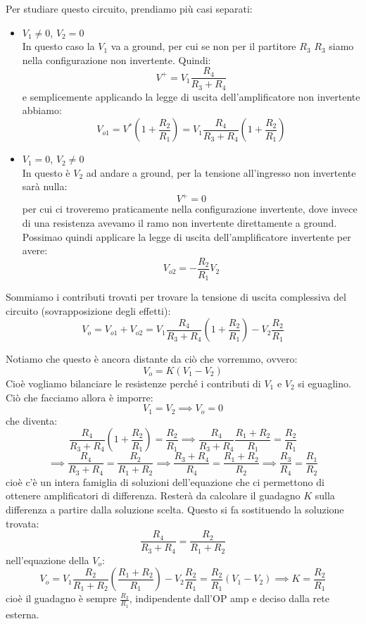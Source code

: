 \documentclass[a4paper,11pt]{article}
\begin{document}
Per studiare questo circuito, prendiamo più casi separati:
\begin{itemize}
\item $V_1 \neq 0$, $V_2 = 0$ \\
In questo caso la $V_1$ va a ground, per cui se non per il partitore $R_3$ $R_3$ siamo nella configurazione non invertente. Quindi:
$$
V^+ = V_1 \frac{R_4}{R_3 + R_4}
$$
e semplicemente applicando la legge di uscita dell'amplificatore non invertente abbiamo:
$$
V_{o1} = V^* \left(1 + \frac{R_2}{R_1}\right) = V_1 \frac{R_4}{R_3 + R_4} \left(1 + \frac{R_2}{R_1}\right)
$$

\item $V_1 = 0$, $V_2 \neq 0$ \\

In questo è $V_2$ ad andare a ground, per la tensione all'ingresso non invertente sarà nulla:
$$
V^+ = 0
$$
per cui ci troveremo praticamente nella configurazione invertente, dove invece di una resistenza avevamo il ramo non invertente direttamente a ground. Possimao quindi applicare la legge di uscita dell'amplificatore invertente per avere:
$$
V_{o2} = -\frac{R_2}{R_1} V_2
$$

\end{itemize}

Sommiamo i contributi trovati per trovare la tensione di uscita complessiva del circuito (sovrapposizione degli effetti):
$$
V_o = V_{o1} + V_{o2} = V_1 \frac{R_4}{R_3 + R_4} (1 + \frac{R_2}{R_1}) - V_2 \frac{R_2}{R_1}
$$

Notiamo che questo è ancora distante da ciò che vorremmo, ovvero:
$$
V_o = K (V_1 - V_2)
$$
Cioè vogliamo bilanciare le resistenze perché i contributi di $V_1$ e $V_2$ si eguaglino. Ciò che facciamo allora è imporre:
$$
V_1 = V_2 \implies V_o = 0
$$
che diventa:
$$
\frac{R_4}{R_3 + R_4} \left( 1 + \frac{R_2}{R_1} \right) = \frac{R_2}{R_1} \implies \frac{R_4}{R_3 + R_4} \frac{R_1 + R_2}{R_1} = \frac{R_2}{R_1} 
$$
$$
\implies \frac{R_4}{R_3 + R_4} = \frac{R_2}{R_1 + R_2} \implies \frac{R_3 + R_4}{R_4} = \frac{R_1 + R_2}{R_2} \implies \frac{R_3}{R_4} = \frac{R_1}{R_2}
$$
cioè c'è un intera famiglia di soluzioni dell'equazione che ci permettono di ottenere amplificatori di differenza. Resterà da calcolare il guadagno $K$ sulla differenza a partire dalla soluzione scelta. Questo si fa sostituendo la soluzione trovata:
$$
\frac{R_4}{R_3 + R_4} = \frac{R_2}{R_1 + R_2}
$$
nell'equazione della $V_o$:
$$
V_o = V_1 \frac{R_2}{R_1 + R_2} \left( \frac{R_1 + R_2}{R_1} \right) - V_2 \frac{R_2}{R_1} = \frac{R_2}{R_1} \left( V_1 - V_2 \right) \implies K = \frac{R_2}{R_1}
$$
cioè il guadagno è sempre $\frac{R_2}{R_1}$, indipendente dall'OP amp e deciso dalla rete esterna.
\end{document}
